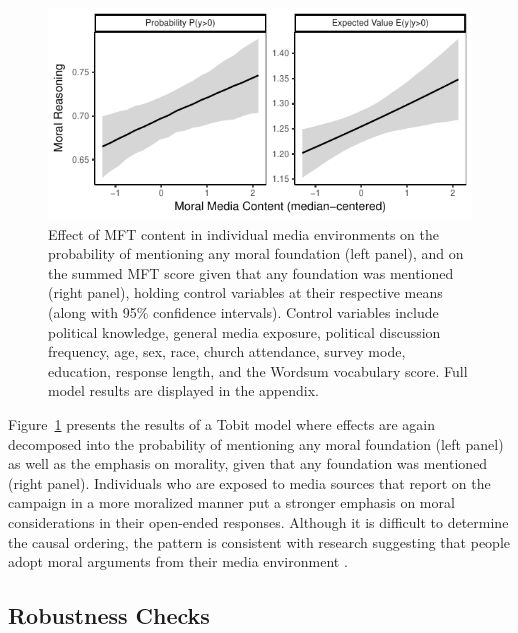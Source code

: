 \documentclass[12pt]{article}
\begin{document}
\begin{figure}[h]\centering
\includegraphics{../calc/fig/tobit_media.pdf}
\caption{Effect of MFT content in individual media environments on the probability of mentioning any moral foundation (left panel), and on the summed MFT score given that any foundation was mentioned (right panel), holding control variables at their respective means (along with 95\% confidence intervals). Control variables include political knowledge, general media exposure, political discussion frequency, age, sex, race, church attendance, survey mode, education, response length, and the Wordsum vocabulary score. Full model results are displayed in the appendix.
}\label{fig:tobit_media}
\end{figure}

Figure~\ref{fig:tobit_media} presents the results of a Tobit model where effects are again decomposed into the probability of mentioning any moral foundation (left panel) as well as the emphasis on morality, given that any foundation was mentioned (right panel). Individuals who are exposed to media sources that report on the campaign in a more moralized manner put a stronger emphasis on moral considerations in their open-ended responses. Although it is difficult to determine the causal ordering, the pattern is consistent with research suggesting that people adopt moral arguments from their media environment \citep[e.g.,][]{clifford2015concerns}. 



\subsection*{Robustness Checks}
\end{document}
